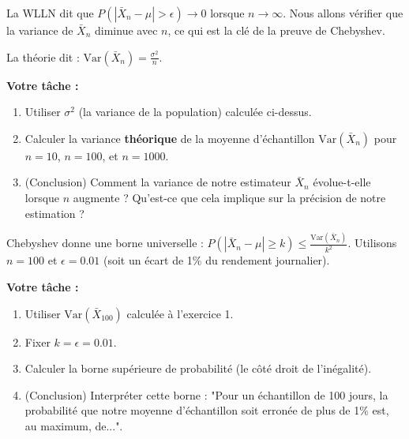 \begin{exercicebox}
La WLLN dit que $P(|\bar{X}_n - \mu| > \epsilon) \to 0$ lorsque $n \to \infty$. Nous allons vérifier que la variance de $\bar{X}_n$ diminue avec $n$, ce qui est la clé de la preuve de Chebyshev.

La théorie dit : $\text{Var}(\bar{X}_n) = \frac{\sigma^2}{n}$.

\textbf{Votre tâche :}
\begin{enumerate}
    \item Utiliser $\sigma^2$ (la variance de la population) calculée ci-dessus.
    \item Calculer la variance \textbf{théorique} de la moyenne d'échantillon $\text{Var}(\bar{X}_n)$ pour $n=10$, $n=100$, et $n=1000$.
    \item (Conclusion) Comment la variance de notre estimateur $\bar{X}_n$ évolue-t-elle lorsque $n$ augmente ? Qu'est-ce que cela implique sur la précision de notre estimation ?
\end{enumerate}
\end{exercicebox}

\begin{exercicebox}
Chebyshev donne une borne universelle : $P(|\bar{X}_n - \mu| \ge k) \le \frac{\text{Var}(\bar{X}_n)}{k^2}$.
Utilisons $n=100$ et $\epsilon = 0.01$ (soit un écart de 1\% du rendement journalier).

\textbf{Votre tâche :}
\begin{enumerate}
    \item Utiliser $\text{Var}(\bar{X}_{100})$ calculée à l'exercice 1.
    \item Fixer $k = \epsilon = 0.01$.
    \item Calculer la borne supérieure de probabilité (le côté droit de l'inégalité).
    \item (Conclusion) Interpréter cette borne : "Pour un échantillon de 100 jours, la probabilité que notre moyenne d'échantillon soit erronée de plus de 1\% est, au maximum, de...".
\end{enumerate}
\end{exercicebox}

